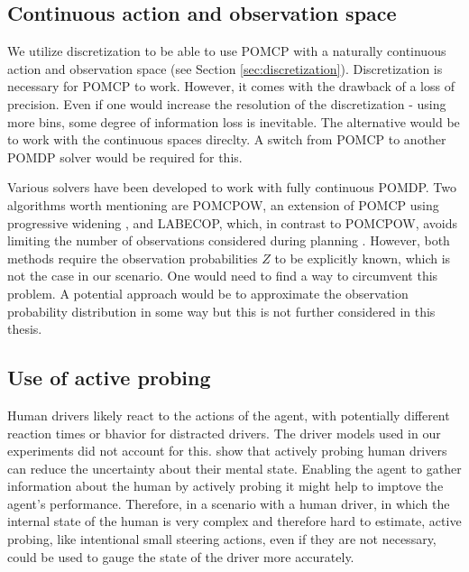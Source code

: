 \subsection{Continuous action and observation space}
\label{sec:conclusion-continuous}

We utilize discretization to be able to use POMCP with a naturally continuous action and observation space (see Section \ref{sec:discretization}). Discretization is necessary for POMCP to work. However, it comes with the drawback of a loss of precision. Even if one would increase the resolution of the discretization - using more bins, some degree of information loss is inevitable. The alternative would be to work with the continuous spaces direclty. A switch from POMCP to another POMDP solver would be required for this.

Various solvers have been developed to work with fully continuous POMDP. Two algorithms worth mentioning are POMCPOW, an extension of POMCP using progressive widening \parencite{online_pomdp_cont}, and LABECOP, which, in contrast to POMCPOW, avoids limiting the number of observations considered during planning \parencite{online-cont-pomdp-2}. However, both methods require the observation probabilities $Z$ to be explicitly known, which is not the case in our scenario. One would need to find a way to circumvent this problem. A potential approach would be to approximate the observation probability distribution in some way but this is not further considered in this thesis.

\subsection{Use of active probing}

Human drivers likely react to the actions of the agent, with potentially different reaction times or bhavior for distracted drivers. The driver models used in our experiments did not account for this. \cite{att_intersec} show that actively probing human drivers can reduce the uncertainty about their mental state. Enabling the agent to gather information about the human by actively probing it might help to imptove the agent's performance. Therefore, in a scenario with a human driver, in which the internal state of the human is very complex and therefore hard to estimate, active probing, like intentional small steering actions, even if they are not necessary, could be used to gauge the state of the driver more accurately.


